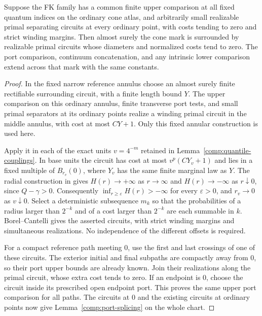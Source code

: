 \begin{lemma}
\label{comp:fk-marked-extension}
Suppose the FK family has a common finite upper comparison at all
fixed quantum indices on the ordinary cone atlas, and arbitrarily
small realizable primal separating circuits at every ordinary point,
with costs tending to zero and strict winding margins.  Then almost surely
the cone mark is surrounded by realizable primal circuits whose
diameters and normalized costs tend to zero.  The port comparison,
continuum concatenation, and any intrinsic lower comparison extend
across that mark with the same constants.
\end{lemma}
\begin{proof}
In the fixed narrow reference annulus choose an almost surely finite
rectifiable surrounding circuit, with a finite length bound $Y$.
The upper comparison on this ordinary annulus, finite transverse
port tests, and small primal separators at its ordinary points
realize a winding primal circuit in the middle annulus, with cost
at most $CY+1$.  Only this fixed annular construction is used here.

Apply it in each of the exact units $v=4^{-m}$ retained in
Lemma~\ref{comp:quantile-couplings}.  In base units the circuit has
cost at most $v^p(CY_v+1)$ and lies in a fixed multiple of
$B_{r_v}(0)$, where $Y_v$ has the same finite marginal law as $Y$.
The radial construction in \cite[Definitions~4.5 and~4.10,
Remark~4.4]{DMS} gives $H(r)\to+\infty$ as $r\to\infty$ and
$H(r)\to-\infty$ as $r\downarrow0$, since $Q-\gamma>0$.
Consequently $\inf_{r\ge\varepsilon}H(r)>-\infty$ for every
$\varepsilon>0$, and $r_v\to0$ as $v\downarrow0$.
Select a deterministic subsequence $m_k$ so that the probabilities
of a radius larger than $2^{-k}$ and of a cost larger than $2^{-k}$
are each summable in $k$.
Borel--Cantelli gives the asserted circuits, with strict winding
margins and simultaneous realizations.  No independence of the
different offsets is required.

For a compact reference path meeting $0$, use the first and last
crossings of one of these circuits.  The exterior initial and final
subpaths are compactly away from $0$, so their port upper bounds
are already known.  Join their realizations along the primal circuit,
whose extra cost tends to zero.  If an endpoint is $0$, choose the
circuit inside its prescribed open endpoint port.  This proves the
same upper port comparison for all paths.  The circuits at $0$ and
the existing circuits at ordinary points now give
Lemma~\ref{comp:port-splicing} on the whole chart.


\end{proof}
